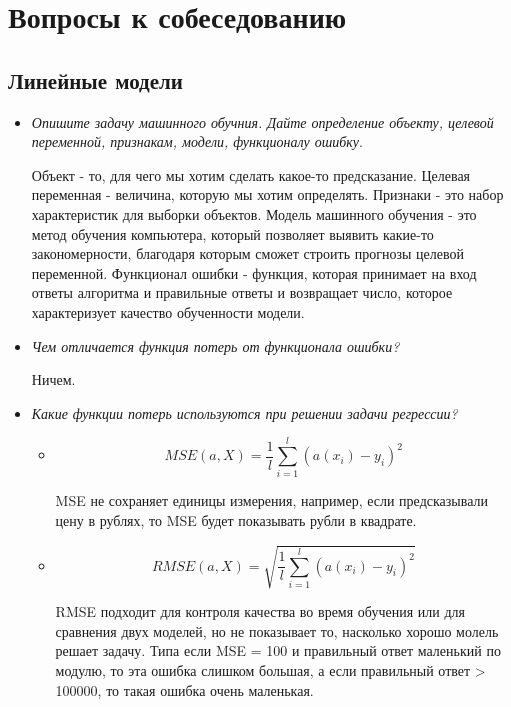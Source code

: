 \documentclass[a4paper]{article}
\author{Васильев Павел}
\begin{document}

\section*{Вопросы к собеседованию}

\subsection*{Линейные модели}

\begin{itemize}

\item \textit{Опишите задачу машинного обучния. Дайте определение объекту, целевой переменной, признакам, модели, функционалу ошибку}.

Объект - то, для чего мы хотим сделать какое-то предсказание. Целевая переменная - величина, которую мы хотим определять. Признаки - это набор характеристик для выборки объектов. Модель машинного обучения - это метод обучения компьютера, который позволяет выявить какие-то закономерности, благодаря которым сможет строить прогнозы целевой переменной. Функционал ошибки - функция, которая принимает на вход ответы алгоритма и правильные ответы и возвращает число, которое характеризует качество обученности модели.

\item \textit{Чем отличается функция потерь от функционала ошибки?}

Ничем.

\item \textit{Какие функции потерь используются при решении задачи регрессии?}

\begin{itemize}
\item \[ MSE(a, X) = \frac{1}{l} \sum_{i=1}^l (a(x_i) - y_i)^2 \]

MSE не сохраняет единицы измерения, например, если предсказывали цену в рублях, то MSE будет показывать рубли в квадрате.

\item \[ RMSE(a, X) = \sqrt{ \frac{1}{l} \sum_{i=1}^l (a(x_i) - y_i)^2 }\]

RMSE подходит для контроля качества во время обучения или для сравнения двух моделей, но не показывает то, насколько хорошо молель решает задачу. Типа если MSE = 100 и правильный ответ маленький по модулю, то эта ошибка слишком большая, а если правильный ответ > 100000, то такая ошибка очень маленькая.


\end{itemize}
\end{itemize}
\end{document}
